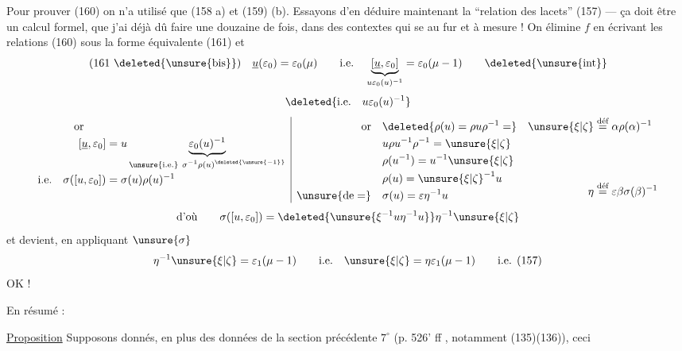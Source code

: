 Pour prouver (160) on n'a utilisé que (158 a) et (159) (b). Essayons d'en déduire maintenant la ``relation des lacets'' (157) --- ça doit être un calcul formel, que j'ai déjà dû faire une douzaine de fois, dans des contextes qui se  au fur et à mesure ! On élimine $f$ en écrivant les relations (160) sous la forme équivalente (161) et
\[
(161\ \deleted{\unsure{\text{bis}}})\quad
\underline u(\varepsilon_0)=\varepsilon_0(\mu)
\qquad\text{i.e.}\quad
\underbrace{[\underline u,\varepsilon_0]}_{u\varepsilon_0(u)^{-1}}
=\varepsilon_0(\mu-1)\qquad\deleted{\unsure{\operatorname{int}}}
\]
\[
\deleted{\text{i.e.}\quad u\varepsilon_0(u)^{-1}}
\]
\[
\begin{array}{l|ll}
\begin{aligned}[t]
\text{or}\qquad&\\
[\underline u,\varepsilon_0]&=
u\underbrace{\varepsilon_0(u)^{-1}}_{\substack{\unsure{\text{i.e.}}\ \sigma^{-1}\rho(u)^{\deleted{\unsure{-1}}}}}\\
\text{i.e.}\quad\sigma([u,\varepsilon_0])&=\sigma(u)\rho(u)^{-1}
\end{aligned}
&
\begin{aligned}[t]
\text{or}\quad&\deleted{\rho(u)=\rho u\rho^{-1}=}\\
&u\rho u^{-1}\rho^{-1}=\unsure{\xi|\zeta}\\
&\rho(u^{-1})=u^{-1}\unsure{\xi|\zeta}\\
&\rho(u)=\unsure{\xi|\zeta}^{-1}u\\
\unsure{\text{de}=}\quad&\sigma(u)=\varepsilon\eta^{-1}u
\end{aligned}
&
\begin{aligned}[t]
\unsure{\xi|\zeta}&\overset{\text{déf}}{=}\alpha\rho(\alpha)^{-1}\\[4em]
\eta&\overset{\text{déf}}{=}\varepsilon\beta\sigma(\beta)^{-1}
\end{aligned}
\end{array}
\]
\[
\text{d'où}\qquad
\sigma([u,\varepsilon_0])=
\deleted{\unsure{\xi^{-1}u\eta^{-1}u}}\eta^{-1}\unsure{\xi|\zeta}
\]
et \unsure{(*)|($\alpha$)} devient, en appliquant $\unsure{\sigma}$
\[
\eta^{-1}\unsure{\xi|\zeta}=\varepsilon_1(\mu-1)
\qquad\text{i.e.}\quad\unsure{\xi|\zeta}=\eta\varepsilon_1(\mu-1)
\qquad\text{i.e. (157)}
\]
\hfill OK !


En résumé :

\uline{Proposition} Supposons donnés, en plus des données de la section précédente $7^\circ$ (p. 526' ff \unsure{\}|)}, notamment (135)(136)),  ceci

